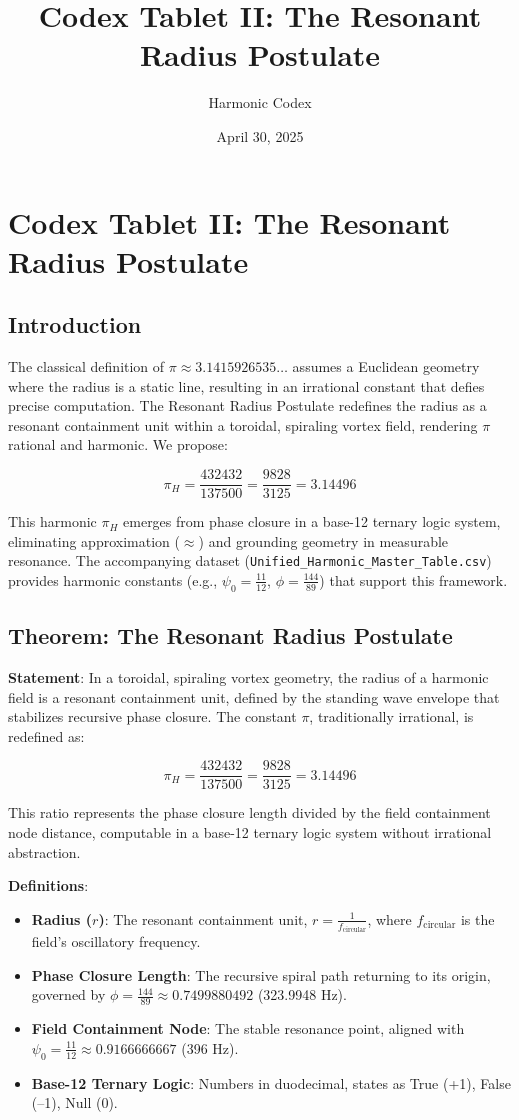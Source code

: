 \documentclass[a4paper,12pt]{article}
\title{Codex Tablet II: The Resonant Radius Postulate}
\author{Harmonic Codex}
\date{April 30, 2025}
\begin{document}
\section{Codex Tablet II: The Resonant Radius Postulate}
\label{sec:resonant_radius}

\subsection{Introduction}
The classical definition of \(\pi \approx 3.1415926535\ldots\) assumes a Euclidean geometry where the radius is a static line, resulting in an irrational constant that defies precise computation. The Resonant Radius Postulate redefines the radius as a resonant containment unit within a toroidal, spiraling vortex field, rendering \(\pi\) rational and harmonic. We propose:

\[
\pi_H = \frac{432432}{137500} = \frac{9828}{3125} = 3.14496
\]

This harmonic \(\pi_H\) emerges from phase closure in a base-12 ternary logic system, eliminating approximation (\(\approx\)) and grounding geometry in measurable resonance. The accompanying dataset (\texttt{Unified\_Harmonic\_Master\_Table.csv}) provides harmonic constants (e.g., \(\psi_0 = \frac{11}{12}\), \(\phi = \frac{144}{89}\)) that support this framework.

\subsection{Theorem: The Resonant Radius Postulate}
\textbf{Statement}: In a toroidal, spiraling vortex geometry, the radius of a harmonic field is a resonant containment unit, defined by the standing wave envelope that stabilizes recursive phase closure. The constant \(\pi\), traditionally irrational, is redefined as:

\[
\pi_H = \frac{432432}{137500} = \frac{9828}{3125} = 3.14496
\]

This ratio represents the phase closure length divided by the field containment node distance, computable in a base-12 ternary logic system without irrational abstraction.

\textbf{Definitions}:
\begin{itemize}
    \item \textbf{Radius (\(r\))}: The resonant containment unit, \( r = \frac{1}{f_{\text{circular}}} \), where \( f_{\text{circular}} \) is the field’s oscillatory frequency.
    \item \textbf{Phase Closure Length}: The recursive spiral path returning to its origin, governed by \(\phi = \frac{144}{89} \approx 0.7499880492\) (323.9948 Hz).
    \item \textbf{Field Containment Node}: The stable resonance point, aligned with \(\psi_0 = \frac{11}{12} \approx 0.9166666667\) (396 Hz).
    \item \textbf{Base-12 Ternary Logic}: Numbers in duodecimal, states as True (+1), False (–1), Null (0).
\end{itemize}
\end{document}
